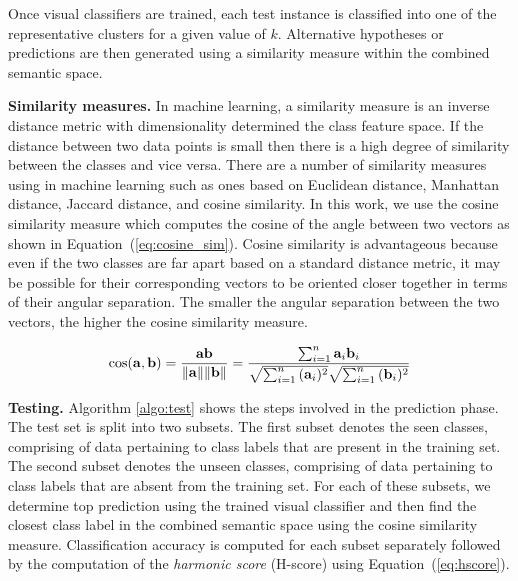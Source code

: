 \par
\medskip
 
Once visual classifiers are trained, each test instance is classified into one of the representative clusters for a given value of $k$. Alternative hypotheses or predictions are then generated using a similarity measure within the combined semantic space.

\par
\medskip
 
\textbf{Similarity measures.} In machine learning, a similarity measure is an inverse distance metric with dimensionality determined the class feature space. If the distance between two data points is small then there is a high degree of similarity between the classes and vice versa. There are a number of similarity measures using in machine learning such as ones based on Euclidean distance, Manhattan distance, Jaccard distance, and cosine similarity. In this work, we use the cosine similarity measure which computes the cosine of the angle between two vectors as shown in Equation~(\ref{eq:cosine_sim}). Cosine similarity is advantageous because even if the two classes are far apart based on a standard distance metric, it may be possible for their corresponding vectors to be oriented closer together in terms of their angular separation. The smaller the angular separation between the two vectors, the higher the cosine similarity measure.

\par
\medskip
 
\begin{equation}
\label{eq:cosine_sim}
\cos ({\bf a},{\bf b})= {{\bf a} {\bf b} \over \|{\bf a}\| \|{\bf b}\|} = \frac{ \sum_{i=1}^{n}{{\bf a}_i{\bf b}_i} }{ \sqrt{\sum_{i=1}^{n}{({\bf a}_i)^2}} \sqrt{\sum_{i=1}^{n}{({\bf b}_i)^2}} }
\end{equation}

\par
\medskip
 
\textbf{Testing.} Algorithm \ref{algo:test} shows the steps involved in the prediction phase. The test set is split into two subsets. The first subset denotes the seen classes, comprising of data pertaining to class labels that are present in the training set. The second subset denotes the unseen classes, comprising of data pertaining to class labels that are absent from the training set. For each of these subsets, we determine top prediction using the trained visual classifier and then find the closest class label in the combined semantic space using the cosine similarity measure. Classification accuracy is computed for each subset separately followed by the computation of the \textit{harmonic score} (H-score) using Equation~(\ref{eq:hscore}).

